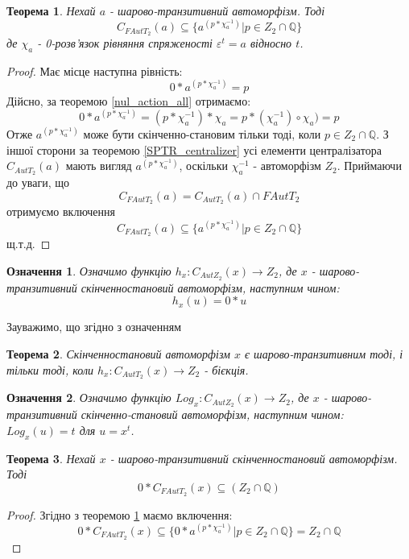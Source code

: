 \documentclass[a4paper,12pt]{article} \usepackage{a4wide}
\numberwithin{equation}{subsection}
\newtheorem{theorem}{Теорема}[subsection]
\newtheorem{definition}{Означення}[subsection]
\begin{document}
\begin{theorem}\label{include_centralizer}
  Нехай $a$ - шарово-транзитивний автоморфізм. Тоді
 $$C_{FAutT_2}(a) \subseteq \{a^{(p*\chi_{a}^{-1})}|p\in Z_2 \cap \mathbb{Q}\} $$ 
 де $\chi_a$ - 0-розв'язок рівняння спряженості $\varepsilon^t=a$
 відносно $t$.
\end{theorem}
\begin{proof}
  Має місце наступна рівність:
$$0*a^{(p*\chi _{a}^{-1})} = p $$ 
Дійсно, за теоремою \ref{nul_action_all} отримаємо:
$$0*a^{(p*\chi _{a}^{-1})} = (p*\chi_{a}^{-1})*\chi_{a} = p*(\chi_{a}^{-1})\circ \chi_a) = p $$ 
Отже $a^{(p*\chi _{a}^{-1})}$ може бути скінченно-становим тільки
тоді, коли $p\in Z_2 \cap \mathbb{Q} $. З іншої сторони за теоремою
\ref{SPTR_centralizer} усі елементи централізатора $C_{AutT_2}(a)$
мають вигляд $a^{(p*\chi _{a}^{-1})}$, оскільки $\chi_a^{-1}$ -
автоморфізм $Z_2$. Приймаючи до уваги, що
$$C_{FAutT_2}(a) = C_{AutT_2}(a)\cap FAutT_2$$
отримуємо включення
 $$C_{FAutT_2}(a) \subseteq \{a^{(p*\chi_{a}^{-1})}|p\in Z_2 \cap \mathbb{Q}\} $$ 
 щ.т.д.
\end{proof}
 
\begin{definition} Означимо функцію $h_x:C_{AutZ_2}(x)\rightarrow
  Z_2$, де $x$ - шарово-транзитивний скінченностановий автоморфізм,
  наступним чином: $$h_x(u)=0*u$$
\end{definition}

Зауважимо, що згідно з означенням

\begin{theorem} Скінченностановий автоморфізм $x$ є
  шарово-транзитивним тоді, і тільки тоді, коли
  $h_x:C_{AutT_2}(x)\rightarrow Z_2$ - бієкція.
\end{theorem}

  \begin{definition}
    Означимо функцію $Log_x:C_{AutZ_2}(x) \rightarrow Z_2$, де $x$ -
    шарово-транзитивний скінченно-становий автоморфізм, наступним
    чином: $Log_x(u)=t$ для $u=x^t$.
  \end{definition}

  \begin{theorem} Нехай $x$ - шарово-транзитивний скінченностановий
    автоморфізм. Тоді
 $$0*C_{FAutT_2}(x)\subseteq(Z_2 \cap \mathbb{Q})$$
\end{theorem}
\begin{proof}
  Згідно з теоремою \ref{include_centralizer} маємо включення:
$$0*C_{FAutT_2}(x)\subseteq \{0*a^{(p*\chi_{a}^{-1})}|p\in Z_2 \cap \mathbb{Q}\} = Z_2 \cap \mathbb{Q}$$
\end{proof}
\end{document}
